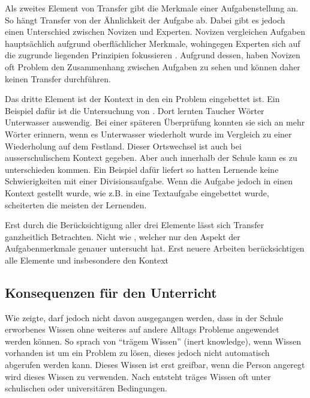 Als zweites Element von Transfer gibt \citeauthor{Marini1995} die Merkmale einer Aufgabenstellung an. So hängt Transfer von der Ähnlichkeit der Aufgabe ab. Dabei gibt es jedoch einen Unterschied zwischen Novizen und Experten. Novizen vergleichen Aufgaben hauptsächlich aufgrund oberflächlicher Merkmale, wohingegen Experten sich auf die zugrunde liegenden Prinzipien fokussieren \citep[s. S. 279]{Marini1995}. Aufgrund dessen, haben Novizen oft Problem den Zusammenhang zwischen Aufgaben zu sehen und können daher keinen Transfer durchführen.

Das dritte Element ist der Kontext in den ein Problem eingebettet ist. Ein Beispiel dafür ist die Untersuchung von \citet{Godden1975}. Dort lernten Taucher Wörter Unterwasser auswendig. Bei einer späteren Überprüfung konnten sie sich an mehr Wörter erinnern, wenn es Unterwasser wiederholt wurde im Vergleich zu einer Wiederholung auf dem Festland. Dieser Ortswechsel ist auch bei ausserschulischem Kontext gegeben. Aber auch innerhalb der Schule kann es zu unterschieden kommen. Ein Beispiel dafür liefert \citet{Schoenfeld1988} so hatten Lernende keine Schwierigkeiten mit einer Divisionsaufgabe. Wenn die Aufgabe jedoch in einen Kontext gestellt wurde, wie z.B. in eine Textaufgabe eingebettet wurde, scheiterten die meisten der Lernenden. 

Erst durch die Berücksichtigung aller drei Elemente lässt sich Transfer ganzheitlich Betrachten. Nicht wie  \citet{Woodworth1901}, welcher nur den Aspekt der Aufgabenmerkmale genauer untersucht hat. Erst neuere Arbeiten berücksichtigen alle Elemente und insbesondere den Kontext \citep{Lobato2002a, Detterman1993, Greeno1996}

\subsection{Konsequenzen für den Unterricht}
\label{sec:TransferUnterricht}

Wie \citet{claxton1990} zeigte, darf jedoch nicht davon ausgegangen werden, dass in der Schule erworbenes Wissen ohne weiteres auf andere Alltags Probleme angewendet werden können. So sprach \citet{Whitehead1929} von "`trägem Wissen"' (inert knowledge), wenn Wissen vorhanden ist um ein Problem zu lösen, dieses jedoch nicht automatisch abgerufen werden kann. Dieses Wissen ist erst greifbar, wenn die Person angeregt wird dieses Wissen zu verwenden. Nach \citet{Whitehead1929} entsteht träges Wissen oft unter schulischen oder universitären Bedingungen. 


